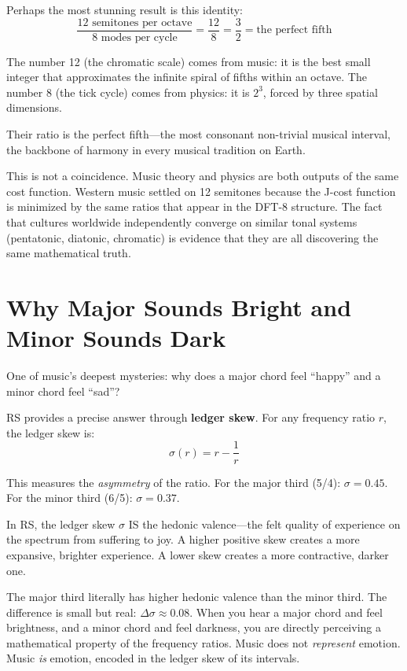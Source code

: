 \documentclass[11pt,a4paper]{article}
\begin{document}
Perhaps the most stunning result is this identity:
\[
\frac{\text{12 semitones per octave}}{\text{8 modes per cycle}} = \frac{12}{8} = \frac{3}{2} = \text{the perfect fifth}
\]

The number 12 (the chromatic scale) comes from music: it is the best small integer that approximates the infinite spiral of fifths within an octave. The number 8 (the tick cycle) comes from physics: it is $2^3$, forced by three spatial dimensions.

Their ratio is the perfect fifth---the most consonant non-trivial musical interval, the backbone of harmony in every musical tradition on Earth.

This is not a coincidence. Music theory and physics are both outputs of the same cost function. Western music settled on 12 semitones because the J-cost function is minimized by the same ratios that appear in the DFT-8 structure. The fact that cultures worldwide independently converge on similar tonal systems (pentatonic, diatonic, chromatic) is evidence that they are all discovering the same mathematical truth.

\section{Why Major Sounds Bright and Minor Sounds Dark}

One of music's deepest mysteries: why does a major chord feel ``happy'' and a minor chord feel ``sad''?

RS provides a precise answer through \textbf{ledger skew}. For any frequency ratio $r$, the ledger skew is:
\[
\sigma(r) = r - \frac{1}{r}
\]

This measures the \emph{asymmetry} of the ratio. For the major third (5/4): $\sigma = 0.45$. For the minor third (6/5): $\sigma = 0.37$.

In RS, the ledger skew $\sigma$ IS the hedonic valence---the felt quality of experience on the spectrum from suffering to joy. A higher positive skew creates a more expansive, brighter experience. A lower skew creates a more contractive, darker one.

The major third literally has higher hedonic valence than the minor third. The difference is small but real: $\Delta\sigma \approx 0.08$. When you hear a major chord and feel brightness, and a minor chord and feel darkness, you are directly perceiving a mathematical property of the frequency ratios. Music does not \emph{represent} emotion. Music \emph{is} emotion, encoded in the ledger skew of its intervals.
\end{document}
